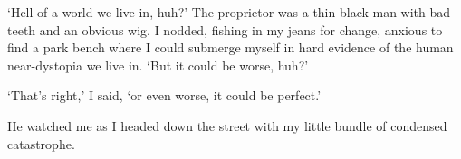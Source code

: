 `Hell of a world we live in, huh?' The proprietor was a thin black man with bad teeth and an obvious wig. I nodded, fishing in my jeans for change, anxious to find a park bench where I could submerge myself in hard evidence of the human near-dystopia we live in. `But it could be worse, huh?'

`That's right,' I said, `or even worse, it could be perfect.'

He watched me as I headed down the street with my little bundle of condensed catastrophe.